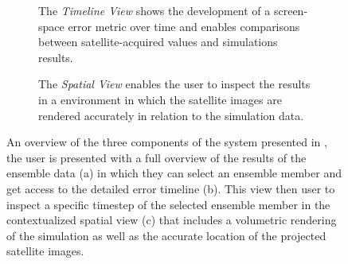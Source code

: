 \begin{landscape}
\begin{figure}
\begin{subfigure}[b]{0.4\textwidth}
    \caption{The \emph{Timeline View} shows the development of a screen-space error metric over time and enables comparisons between satellite-acquired values and simulations results.}
    \label{contributions:astro:spaceweather:system:timeline}
\end{subfigure}
\hfill
\begin{subfigure}[b]{0.4\textwidth}
   \caption{The \emph{Spatial View} enables the user to inspect the results in a  environment in which the satellite images are rendered accurately in relation to the simulation data.}
   \label{contributions:astro:spaceweather:system:rendering}
\end{subfigure}
\caption{An overview of the three components of the system presented in , the user is presented with a full overview of the results of the ensemble data (a) in which they can select an ensemble member and get access to the detailed error timeline (b).  This view then user to inspect a specific timestep of the selected ensemble member in the contextualized spatial view (c) that includes a volumetric rendering of the simulation as well as the accurate location of the projected satellite images.}
\label{contributions:astro:spaceweather:system}
\end{figure}
\end{landscape}





